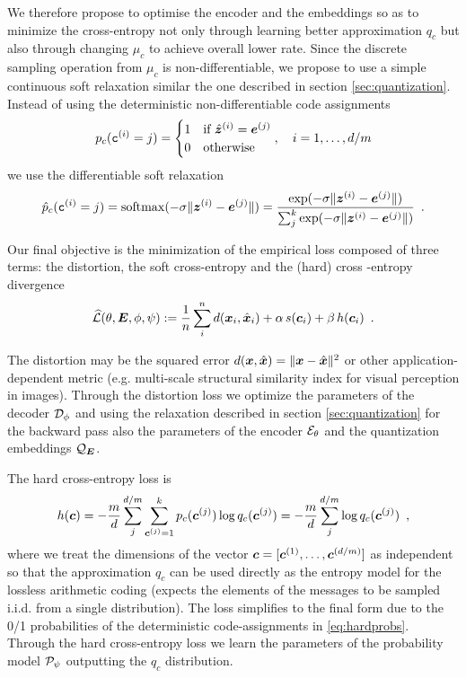 \documentclass{article} %
\renewcommand{\rvc}{\mathtt{c}}
\newcommand{\Lsh}{\widehat{\Ls}}
\newcommand{\pc}{p_c}
\newcommand{\qc}{q_c}
\newcommand{\gEt}{\gE_\theta}
\newcommand{\gQE}{\gQ_\mE}
\newcommand{\gDp}{\gD_\phi}
\newcommand{\vzh}{\hat{\vz}}
\newcommand{\vxh}{\hat{\vx}}
\newcommand{\gPp}{\gP_{\psi}}
\begin{document}
We therefore propose to optimise the encoder and the embeddings so as to minimize the cross-entropy not only through learning better approximation $\qc$ but also through changing $\mu_c$ to achieve overall lower rate.
Since the discrete sampling operation from $\mu_c$ is non-differentiable, we propose to use a simple continuous soft relaxation similar the one described in section \ref{sec:quantization}.
Instead of using the deterministic non-differentiable code assignments
\begin{align}\label{eq:hardprobs}
\pc(\rvc^{(i)} = j) =
\begin{cases}
1 & \text{if} \ \vzh^{(i)} = \ve^{(j)} \\
0 & \text{otherwise}
\end{cases},
\quad i = 1, \ldots, d/m
\end{align}
we use the differentiable soft relaxation
\begin{align}\label{eq:softprobs}
\hat{p}_c(\rvc^{(i)} = j) = \softmax(-\sigma \Vert \vz^{(i)} - \ve^{(j)} \Vert) = \frac{\exp(-\sigma \Vert \vz^{(i)} - \ve^{(j)} \Vert)}{\sum_j^k \exp(-\sigma \Vert \vz^{(i)} - \ve^{(j)} \Vert)} \enspace .
\end{align}

Our final objective is the minimization of the empirical loss composed of three terms: the distortion, the soft cross-entropy and the (hard) cross -entropy divergence
\begin{align}\label{eq:loss_final}
\Lsh(\theta, \mE, \phi, \psi) := \frac{1}{n}\sum_i^n d(\vx_i, \vxh_i) + \alpha \, s(\vc_i) + \beta \, h(\vc_i) \enspace .
\end{align}

The distortion may be the squared error $d(\vx, \vxh) = \Vert \vx - \vxh \Vert^2$ or other application-dependent metric (e.g. multi-scale structural similarity index for visual perception in images).
Through the distortion loss we optimize the parameters of the decoder $\gDp$ and using the relaxation described in section \ref{sec:quantization} for the backward pass also the parameters of the encoder $\gEt$ and the quantization embeddings $\gQE$.

The hard cross-entropy loss is
\begin{align}
h(\vc) = - \frac{m}{d} \sum_j^{d/m} \sum_{\vc^{(j)} = 1}^k \pc(\vc^{(j)}) \log \qc(\vc^{(j)})
= - \frac{m}{d} \sum_j^{d/m} \log \qc(\vc^{(j)}) \enspace ,
\end{align}
where we treat the dimensions of the vector ${\bm{c}} = [{\bm{c}}^{(1)}, \ldots, {\bm{c}}^{(d/m)}]$ as independent so that the approximation $\qc$ can be used directly as the entropy model for the lossless arithmetic coding (expects the elements of the messages to be sampled i.i.d. from a single distribution).
The loss simplifies to the final form due to the 0/1 probabilities of the deterministic code-assignments in \eqref{eq:hardprobs}.
Through the hard cross-entropy loss we learn the parameters of the probability model $\gPp$ outputting the $\qc$ distribution.
\end{document}
